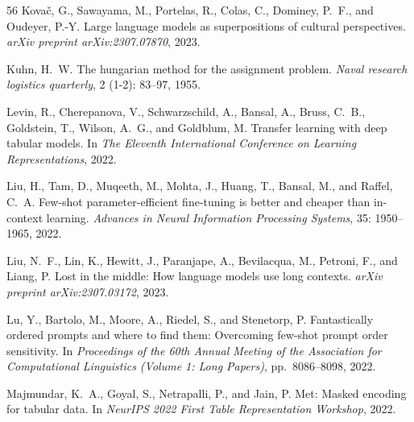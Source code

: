 \documentclass{article}
\theoremstyle{plain}
\theoremstyle{definition}
\theoremstyle{remark}
\begin{document}
\begin{thebibliography}{56}
Kova{\v{c}}, G., Sawayama, M., Portelas, R., Colas, C., Dominey, P.~F., and
  Oudeyer, P.-Y.
\newblock Large language models as superpositions of cultural perspectives.
\newblock \emph{arXiv preprint arXiv:2307.07870}, 2023.

Kuhn, H.~W.
\newblock The hungarian method for the assignment problem.
\newblock \emph{Naval research logistics quarterly}, 2 (1-2):
  83--97, 1955.

Levin, R., Cherepanova, V., Schwarzschild, A., Bansal, A., Bruss, C.~B.,
  Goldstein, T., Wilson, A.~G., and Goldblum, M.
\newblock Transfer learning with deep tabular models.
\newblock In \emph{The Eleventh International Conference on Learning
  Representations}, 2022.

Liu, H., Tam, D., Muqeeth, M., Mohta, J., Huang, T., Bansal, M., and Raffel,
  C.~A.
\newblock Few-shot parameter-efficient fine-tuning is better and cheaper than
  in-context learning.
\newblock \emph{Advances in Neural Information Processing Systems},
  35: 1950--1965, 2022.

Liu, N.~F., Lin, K., Hewitt, J., Paranjape, A., Bevilacqua, M., Petroni, F.,
  and Liang, P.
\newblock Lost in the middle: How language models use long contexts.
\newblock \emph{arXiv preprint arXiv:2307.03172}, 2023.

Lu, Y., Bartolo, M., Moore, A., Riedel, S., and Stenetorp, P.
\newblock Fantastically ordered prompts and where to find them: Overcoming
  few-shot prompt order sensitivity.
\newblock In \emph{Proceedings of the 60th Annual Meeting of the Association
  for Computational Linguistics (Volume 1: Long Papers)}, pp.\  8086--8098,
  2022.

Majmundar, K.~A., Goyal, S., Netrapalli, P., and Jain, P.
\newblock Met: Masked encoding for tabular data.
\newblock In \emph{NeurIPS 2022 First Table Representation Workshop}, 2022.


\end{thebibliography}
\end{document}
